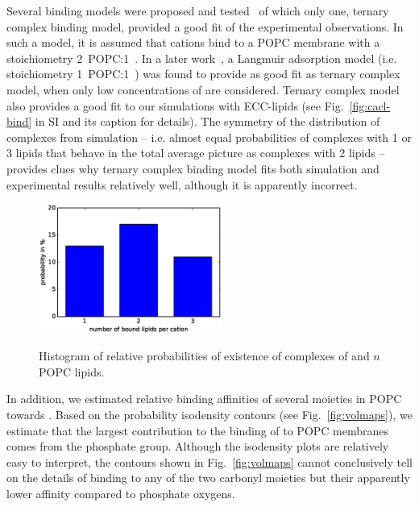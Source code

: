 \documentclass[aip,jcp,twocolumn]{revtex4}
\begin{document}
Several binding models were proposed and tested~\cite{altenbach84} of which only one,
ternary complex binding model, provided a good fit of the experimental observations. 
In such a model, it is assumed that  cations bind to a POPC membrane 
with a stoichiometry 2~POPC:1~.
In a later work~\cite{macdonald87}, 
a Langmuir adsorption model (i.e. stoichiometry 1~POPC:1~) 
was found to provide as good fit as ternary complex model, 
when only low concentrations of  are considered.
Ternary complex model also provides a good fit 
to our simulations with ECC-lipids 
(see Fig.~\ref{fig:cacl-bind} in SI and its caption for details). 
The symmetry of the distribution of complexes from simulation --  
i.e. almost equal probabilities of complexes with 1 or 3 lipids 
that behave in the total average picture as complexes with 2 lipids -- 
provides clues why ternary complex binding model 
fits both simulation and experimental results relatively well, 
although it is apparently incorrect. 

\begin{figure}[tbp]
  \centering
  \includegraphics[width=6.0cm]{../Fig/number_bound_lipids_p_cation_Ecc-lipids.eps} \\
  \caption{\label{fig:cacl_complexes}
      Histogram of relative probabilities of existence of complexes
      of  and $n$ POPC lipids. 
  }
\end{figure}

In addition, we estimated relative binding affinities 
of several moieties in POPC towards . 
Based on the probability isodensity contours (see Fig.~\ref{fig:volmaps}), 
we estimate that the largest contribution
to the binding of  to POPC membranes comes from the phosphate group. 
Although the isodensity plots are relatively easy to interpret,
the contours shown in Fig.~\ref{fig:volmaps} cannot conclusively tell on the details
of  binding to any of the two carbonyl moieties
but their apparently lower affinity compared to phosphate oxygens. 
\end{document}

